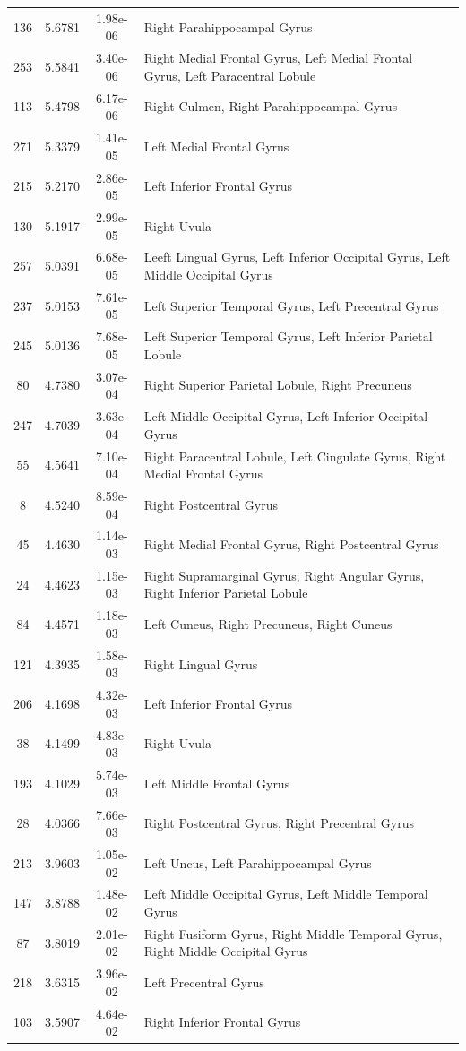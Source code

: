 \documentclass[10pt,letterpaper]{article}\usepackage[]{graphicx}\usepackage[]{color}
\begin{document}
\begin{longtable}[c]{cccp{3.2in}}
	136 & 5.6781 & 1.98e-06 & Right Parahippocampal Gyrus \\
	253 & 5.5841 & 3.40e-06 & Right Medial Frontal Gyrus, Left Medial Frontal Gyrus, Left Paracentral Lobule \\
	113 & 5.4798 & 6.17e-06 & Right Culmen, Right Parahippocampal Gyrus \\
	271 & 5.3379 & 1.41e-05 & Left Medial Frontal Gyrus \\
	215 & 5.2170 & 2.86e-05 & Left Inferior Frontal Gyrus \\
	130 & 5.1917 & 2.99e-05 & Right Uvula \\
	257 & 5.0391 & 6.68e-05 & Leeft Lingual Gyrus, Left Inferior Occipital Gyrus, Left Middle Occipital Gyrus \\
	237 & 5.0153 & 7.61e-05 & Left Superior Temporal Gyrus, Left Precentral Gyrus \\
	245 & 5.0136 & 7.68e-05 & Left Superior Temporal Gyrus, Left Inferior Parietal Lobule \\
	80 & 4.7380 & 3.07e-04 & Right Superior Parietal Lobule, Right Precuneus \\
	247 & 4.7039 & 3.63e-04 & Left Middle Occipital Gyrus, Left Inferior Occipital Gyrus \\
	55 & 4.5641 & 7.10e-04 & Right Paracentral Lobule, Left Cingulate Gyrus, Right Medial Frontal Gyrus \\
	8 & 4.5240 & 8.59e-04 & Right Postcentral Gyrus \\
	45 & 4.4630 & 1.14e-03 & Right Medial Frontal Gyrus, Right Postcentral Gyrus \\
	24 & 4.4623 & 1.15e-03 & Right Supramarginal Gyrus, Right Angular Gyrus, Right Inferior Parietal Lobule \\
	84 & 4.4571 & 1.18e-03 & Left Cuneus, Right Precuneus, Right Cuneus \\
	121 & 4.3935 & 1.58e-03 & Right Lingual Gyrus \\
	206 & 4.1698 & 4.32e-03 & Left Inferior Frontal Gyrus \\
	38 & 4.1499 & 4.83e-03 & Right Uvula \\
	193 & 4.1029 & 5.74e-03 & Left Middle Frontal Gyrus \\
	28 & 4.0366 & 7.66e-03 & Right Postcentral Gyrus, Right Precentral Gyrus \\
	213 & 3.9603 & 1.05e-02 & Left Uncus, Left Parahippocampal Gyrus \\
	147 & 3.8788 & 1.48e-02 & Left Middle Occipital Gyrus, Left Middle Temporal Gyrus \\
	87 & 3.8019 & 2.01e-02 & Right Fusiform Gyrus, Right Middle Temporal Gyrus, Right Middle Occipital Gyrus \\
	218 & 3.6315 & 3.96e-02 & Left Precentral Gyrus \\
	103 & 3.5907 & 4.64e-02 & Right Inferior Frontal Gyrus \\
\end{longtable}
\end{document}
